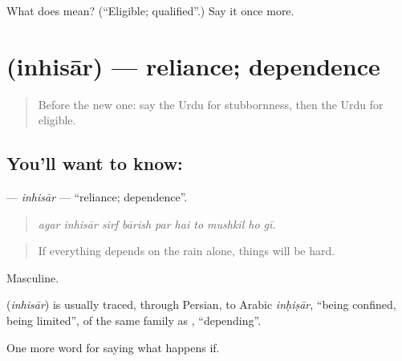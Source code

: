 \begin{tcolorbox}[breakable,colback=teal!4,colframe=teal!35!black,title={Before you move on}]
What does  mean? (\textquotedblleft{}Eligible; qualified\textquotedblright{}.) Say it once more.
\end{tcolorbox}
\section[\texorpdfstring{\ur{انحصار} (inhisār)}{انحصار (inhisār)}]{ (inhisār) — reliance; dependence}

\label{lesson:UR-C374-inhisar}



\begin{quote}
Before the new one: say the Urdu for stubbornness, then the Urdu for eligible.
\end{quote}

\subsection*{You'll want to know: }
\textbf{} — \emph{inhisār} — \textquotedblleft{}reliance; dependence\textquotedblright{}.

\begin{quote}
         
\end{quote}

\begin{quote}
\emph{agar inhisār sirf bārish par hai to mushkil ho gī.}
\end{quote}

\begin{quote}
If everything depends on the rain alone, things will be hard.
\end{quote}

Masculine.

\begin{cousinweb}
\textbf{} (\emph{inhisār}) is usually traced, through Persian, to Arabic \emph{inḥiṣār}, \textquotedblleft{}being confined, being limited\textquotedblright{}, of the same family as \textbf{}, \textquotedblleft{}depending\textquotedblright{}.
\end{cousinweb}

\begin{grammarlens}[title={What you've built}]
One more word for saying what happens if.
\end{grammarlens}

